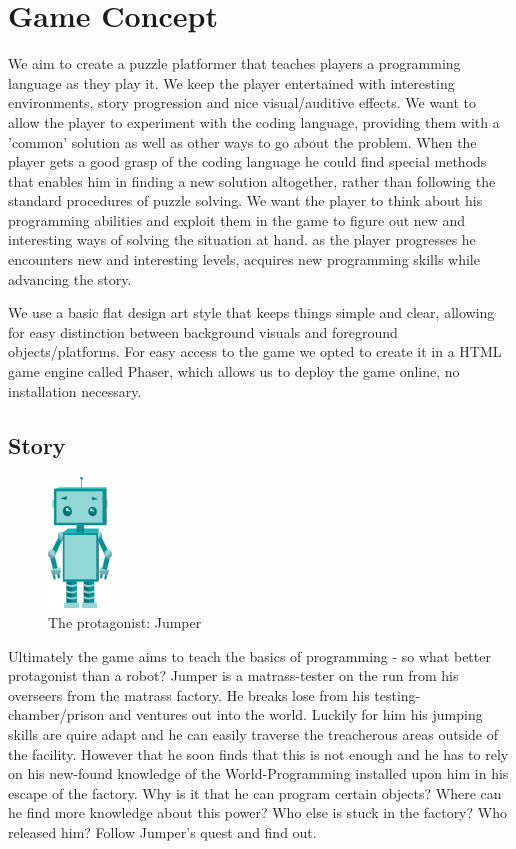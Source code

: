 \documentclass[a4paper,twoside,12pt]{article}
\begin{document}
\section{Game Concept}
We aim to create a puzzle platformer that teaches players a programming language as they play it. We keep the player entertained with interesting environments, story progression and nice visual/auditive effects. We want to allow the player to experiment with the coding language, providing them with a 'common' solution as well as other ways to go about the problem. When the player gets a good grasp of the coding language he could find special methods that enables him in finding a new solution altogether, rather than following the standard procedures of puzzle solving. We want the player to think about his programming abilities and exploit them in the game to figure out new and interesting ways of solving the situation at hand.
as the player progresses he encounters new and interesting levels, acquires new programming skills while advancing the story.

We use a basic flat design art style that keeps things simple and clear, allowing for easy distinction between background visuals and foreground objects/platforms. For easy access to the game we opted to create it in a HTML game engine called Phaser, which allows us to deploy the game online, no installation necessary.

\subsection{Story}

\begin{figure}[H]
\centering
\includegraphics[scale=1.5]{jumper}
\caption{The protagonist: Jumper}
\end{figure}

Ultimately the game aims to teach the basics of programming - so what better protagonist than a robot?
Jumper is a matrass-tester on the run from his overseers from the matrass factory. He breaks lose from his testing-chamber/prison and ventures out into the world. Luckily for him his jumping skills are quire adapt and he can easily traverse the treacherous areas outside of the facility. However that he soon finds that this is not enough and he has to rely on his new-found knowledge of the World-Programming installed upon him in his escape of the factory. Why is it that he can program certain objects? Where can he find more knowledge about this power? Who else is stuck in the factory? Who released him? Follow Jumper's quest and find out.
\end{document}
